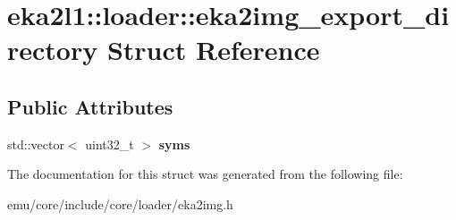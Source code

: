 \hypertarget{structeka2l1_1_1loader_1_1eka2img__export__directory}{}\section{eka2l1\+:\+:loader\+:\+:eka2img\+\_\+export\+\_\+directory Struct Reference}
\label{structeka2l1_1_1loader_1_1eka2img__export__directory}
\subsection*{Public Attributes}
\begin{DoxyCompactItemize}
\item 
\mbox{\label{structeka2l1_1_1loader_1_1eka2img__export__directory_a477251498a3ff8ed0e511a8c4b77a01c}} 
std\+::vector$<$ uint32\+\_\+t $>$ {\bfseries syms}
\end{DoxyCompactItemize}


The documentation for this struct was generated from the following file\+:\begin{DoxyCompactItemize}
\item 
emu/core/include/core/loader/eka2img.\+h\end{DoxyCompactItemize}
